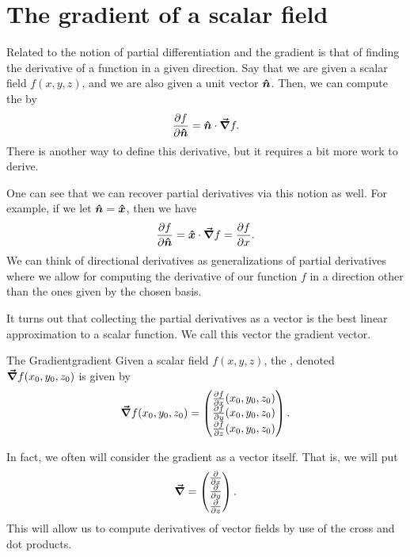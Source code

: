 \section{The gradient of a scalar field}
                        Related to the notion of partial differentiation and the gradient is that of finding the derivative of a function in a given direction.  Say that we are given a scalar field $f(x,y,z)$, and we are also given a unit vector $\boldsymbol{\hat{n}}$.  Then, we can compute the  by
                        \[
                        \frac{\partial f}{\partial \boldsymbol{\hat{n}}} = \boldsymbol{\hat{n}} \cdot \boldsymbol{\vec{\nabla}} f.
                        \]
                        There is another way to define this derivative, but it requires a bit more work to derive.


                        One can see that we can recover partial derivatives via this notion as well.  For example, if we let $\boldsymbol{\hat{n}} = \boldsymbol{\hat{x}}$, then we have
                        \[
                        \frac{\partial f}{\partial \boldsymbol{\hat{n}}} = \boldsymbol{\hat{x}} \cdot \boldsymbol{\vec{\nabla}} f = \frac{\partial f}{\partial x}.
                        \]
                        We can think of directional derivatives as generalizations of partial derivatives where we allow for computing the derivative of our function $f$ in a direction other than the ones given by the chosen basis.

                        It turns out that collecting the partial derivatives as a vector is the best linear approximation to a scalar function.  We call this vector the gradient vector.

                        \begin{df}{The Gradient}{gradient}
                        Given a scalar field $f(x,y,z)$, the , denoted $\boldsymbol{\vec{\nabla}} f(x_0,y_0,z_0)$ is given by
                        \[
                        \boldsymbol{\vec{\nabla}} f(x_0,y_0,z_0)=\begin{pmatrix} \frac{\partial f}{\partial x}(x_0,y_0,z_0)\\ \frac{\partial f}{\partial y}(x_0,y_0,z_0)\\ \frac{\partial f}{\partial z}(x_0,y_0,z_0)\end{pmatrix}.
                        \]
                        \end{df}

                        In fact, we often will consider the gradient as a vector itself.  That is, we will put
                        \[
                        \boldsymbol{\vec{\nabla}} = \begin{pmatrix} \frac{\partial}{\partial x} \\ \frac{\partial}{\partial y} \\ \frac{\partial}{\partial z} \end{pmatrix}.
                        \]
                        This will allow us to compute derivatives of vector fields by use of the cross and dot products.

